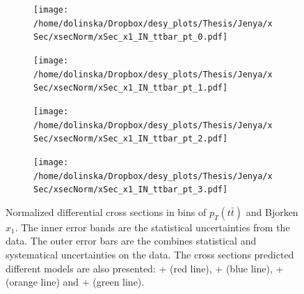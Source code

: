 \begin{figure}[p]
\centering
\begin{subfigure}
  \centering
  \texttt{[image: /home/dolinska/Dropbox/desy\_plots/Thesis/Jenya/xSec/xsecNorm/xSec\_x1\_IN\_ttbar\_pt\_0.pdf]}
\end{subfigure}
\begin{subfigure}
  \centering
  \texttt{[image: /home/dolinska/Dropbox/desy\_plots/Thesis/Jenya/xSec/xsecNorm/xSec\_x1\_IN\_ttbar\_pt\_1.pdf]}
\end{subfigure}
\begin{subfigure}
  \centering
  \texttt{[image: /home/dolinska/Dropbox/desy\_plots/Thesis/Jenya/xSec/xsecNorm/xSec\_x1\_IN\_ttbar\_pt\_2.pdf]}
\end{subfigure}
\begin{subfigure}
  \centering
  \texttt{[image: /home/dolinska/Dropbox/desy\_plots/Thesis/Jenya/xSec/xsecNorm/xSec\_x1\_IN\_ttbar\_pt\_3.pdf]}
\end{subfigure}
\caption{Normalized differential cross sections in bins of $p_{T}(t\bar{t})$ and Bjorken $x_{1}$. The inner error bands are the statistical uncertainties from the data.
         The outer error bars are the combines statistical and systematical uncertainties on the data. The cross sections predicted different models are also presented:
         \MG + \PYTHIA (red line), \Powheg + \PYTHIA (blue line), \Powheg + \HERWIG (orange line) and \MCNLO + \HERWIG (green line).}
\label{fig:XS_2D_x1_pttt1}
\end{figure}


% 
% 

